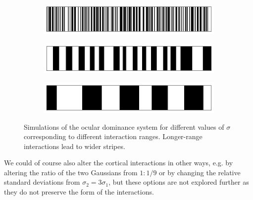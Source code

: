 \documentclass{article}
\begin{document}
\begin{figure}[h]
	\centering
	\begin{subfigure}[t]{0.60\linewidth}
		\centering
		\includegraphics[width = 1.0\linewidth, trim={0 0 0 0}, clip=true]{figures/occsim_012_heat.png}
	\end{subfigure}%
	\hspace{0.03\linewidth}
	\begin{subfigure}[t]{0.60\linewidth}
		\centering
		\includegraphics[width = 1.0\linewidth, trim={0 0 0 0}, clip=true]{figures/occsim_066_heat.png}
	\end{subfigure}%
	\hspace{0.03\linewidth}
	\begin{subfigure}[t]{0.60\linewidth}
		\centering
		\includegraphics[width = 1.0\linewidth, trim={0 0 0 0}, clip=true]{figures/occsim_174_heat.png}
	\end{subfigure}%
\caption{Simulations of the ocular dominance system for different values of $\sigma$ corresponding to different interaction ranges. Longer-range interactions lead to wider stripes.}
\label{fig:sigs}
\end{figure}

We could of course also alter the cortical interactions in other ways, e.g. by altering the ratio of the two Gaussians from $1 : 1/9$ or by changing the relative standard deviations from $\sigma_2 = 3 \sigma_1$, but these options are not explored further as they do not preserve the form of the interactions.
\end{document}
